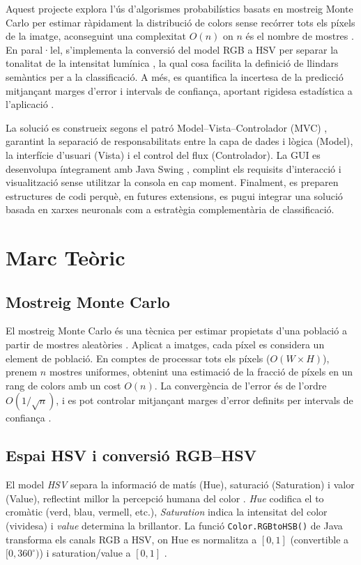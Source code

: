 \documentclass{ieeetj}
\begin{document}
Aquest projecte explora l’ús d’algorismes probabilístics basats en mostreig Monte Carlo\cite{hammersley1964} per estimar ràpidament la distribució de colors sense recórrer tots els píxels de la imatge, aconseguint una complexitat \(O(n)\) on \(n\) és el nombre de mostres \cite{hammersley1964}. \newline
En paral·lel, s’implementa la conversió del model RGB a HSV per separar la tonalitat de la intensitat lumínica \cite{smith1978}, la qual cosa facilita la definició de llindars semàntics per a la classificació. A més, es quantifica la incertesa de la predicció mitjançant marges d’error i intervals de confiança, aportant rigidesa estadística a l’aplicació \cite{hammersley1964}.\newline

La solució es construeix segons el patró Model–Vista–Controlador (MVC) \cite{gamma1994}, garantint la separació de responsabilitats entre la capa de dades i lògica (Model), la interfície d’usuari (Vista) i el control del flux (Controlador). \newline
La GUI es desenvolupa íntegrament amb Java Swing \cite{gafter1999}, complint els requisits d’interacció i visualització sense utilitzar la consola en cap moment. Finalment, es preparen estructures de codi perquè, en futures extensions, es pugui integrar una solució basada en xarxes neuronals com a estratègia complementària de classificació.

\section{Marc Teòric}
\subsection{Mostreig Monte Carlo}
El mostreig Monte Carlo és una tècnica per estimar propietats d’una població a partir de mostres aleatòries \cite{hammersley1964}. Aplicat a imatges, cada píxel es considera un element de població. En comptes de processar tots els píxels (\(O(W\times H)\)), prenem \(n\) mostres uniformes, obtenint una estimació de la fracció de píxels en un rang de colors amb un cost \(O(n)\). La convergència de l'error és de l'ordre \(O(1/\sqrt{n})\), i es pot controlar mitjançant marges d’error definits per intervals de confiança \cite{hammersley1964}.

\subsection{Espai HSV i conversió RGB–HSV}
El model \emph{HSV} separa la informació de matís (Hue), saturació (Saturation) i valor (Value), reflectint millor la percepció humana del color \cite{smith1978}. \textit{Hue} codifica el to cromàtic (verd, blau, vermell, etc.), \textit{Saturation} indica la intensitat del color (vividesa) i \textit{value} determina la brillantor. \newline
La funció \texttt{Color.RGBtoHSB()} de Java transforma els canals RGB a HSV, on Hue es normalitza a \([0,1]\) (convertible a \([0,360^\circ)\)) i saturation/value a \([0,1]\) \cite{gafter1999}\cite{stackexchangeHSVtoRGB}.
\end{document}
